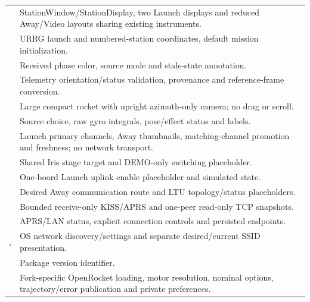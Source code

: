 \begin{longtable}{@{}L{.29\linewidth}L{.64\linewidth}@{}}
 & StationWindow/StationDisplay, two Launch displays and reduced Away/Video layouts sharing existing instruments. \\
 & URRG launch and numbered-station coordinates, default mission initialization. \\
 & Received phase color, source mode and stale-state annotation. \\
 & Telemetry orientation/status validation, provenance and reference-frame conversion. \\
 & Large compact rocket with upright azimuth-only camera; no drag or scroll. \\
 & Source choice, raw gyro integrals, pose/effect status and labels. \\
 & Launch primary channels, Away thumbnails, matching-channel promotion and freshness; no network transport. \\
 & Shared Iris stage target and DEMO-only switching placeholder. \\
 & One-board Launch uplink enable placeholder and simulated state. \\
 & Desired Away communication route and LTU topology/status placeholders. \\
 & Bounded receive-only KISS/APRS and one-peer read-only TCP snapshots. \\
 & APRS/LAN status, explicit connection controls and persisted endpoints. \\
,  & OS network discovery/settings and separate desired/current SSID presentation. \\
 & Package version identifier. \\
 & Fork-specific OpenRocket loading, motor resolution, nominal options, trajectory/error publication and private preferences. \\
\bottomrule
\end{longtable}

